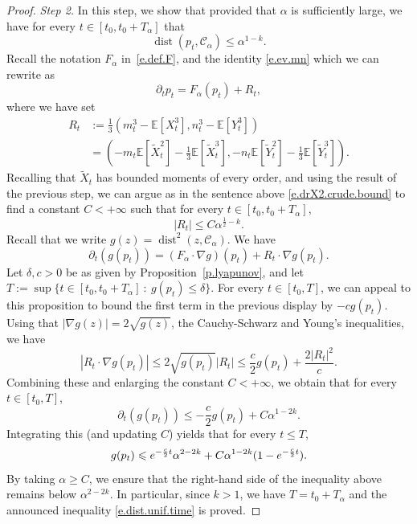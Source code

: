 \documentclass[10pt,a4paper]{amsart}
\DeclareMathOperator{\dist}{dist}
\newcommand{\E}{\mathbb E}
\newcommand{\Ll}{\left}
\newcommand{\Rr}{\right}
\newcommand{\al}{\alpha}
\newcommand{\de}{\delta}
\newcommand{\dr}{\partial}
\newcommand{\msc}{\mathscr}
\newcommand{\td}{\widetilde}
\renewcommand{\ge}{\geqslant}
\renewcommand{\le}{\leqslant}
\begin{document}
\begin{proof}
\noindent \emph{Step 2.} In this step, we show that provided that $\alpha$ is sufficiently large, we have for every $t \in [t_0, t_0 + T_\al]$ that 
\begin{equation}  
\label{e.dist.unif.time}
\dist(p_t, \msc C_\al) \le \al^{1-k}.
\end{equation}
Recall the notation $F_\al$ in~\eqref{e.def.F}, and the identity \eqref{e.ev.mn} which we can rewrite as
\begin{equation}  
\label{e.evol.p.R}
\dr_t p_t = F_\al(p_t) + R_t, 
\end{equation}
where we have set
\begin{align*}  %
R_t & := \frac 1 3 (m_t^3 - \E[X_t^3], n_t^3 - \E[Y_t^3]) 
\\
& =  \Ll(-m_t \E[\td X_t^2] -\frac 1 3 \E[\td X_t^3], -n_t \E[\td Y_t^2] - \frac 1 3 \E[\td Y_t^3]\Rr).
\end{align*}
Recalling that $\td X_t$ has bounded moments of every order, and using the result of the previous step, we can argue as in the sentence above \eqref{e.drX2.crude.bound} to find a constant $C < +\infty$ such that for every $t \in [t_0, t_0 + T_\al]$,
\begin{equation}  
\label{e.bound.R}
|R_t| \le C \al^{\frac 1 2 - k}.
\end{equation}
Recall that we write $g(z) = \dist^2(z, \msc C_\al)$. We have
\begin{equation*}  %
\dr_t (g(p_t)) = (F_\al \cdot \nabla g)(p_t) + R_t \cdot \nabla g(p_t). 
\end{equation*}
Let $\delta, c > 0$ be as given by Proposition~\ref{p.lyapunov}, and let $T := \sup \{ t \in [t_0, t_0 + T_\al] \ : \ g(p_t) \le \de\}$. For every $t \in [t_0, T]$, we can appeal to this proposition to bound the first term in the previous display by $-c g(p_t)$. 
Using that $|\nabla g(z)| = 2  \sqrt{g(z)}$, the Cauchy-Schwarz and Young's inequalities, we have
\begin{equation*}  %
|R_t \cdot \nabla g(p_t)| \le 2 \sqrt{g(p_t)} |R_t| \le \frac{c}{2} g(p_t) + \frac {2|R_t|^2}{c}.
\end{equation*}
Combining these and enlarging the constant $C < +\infty$, we obtain that for every $t \in [t_0, T]$,
\begin{equation*}  %
\dr_t (g(p_t)) \le -\frac c 2 g(p_t) + C \al^{1-2k}.
\end{equation*}
Integrating this (and updating $C$) yields that for every $t \le T$, 
\begin{equation}
\notag
g(p_t)  \le e^{-\frac{c}{2}t} \al^{2-2k} + C \al^{1-2k} (1 - e^{-\frac c 2 t}).
\end{equation}
By taking $\al \ge C$, we ensure that the right-hand side of the inequality above remains below $\al^{2-2k}$. In particular, since $k > 1$, we have $T = t_0 + T_\al$ and the announced inequality \eqref{e.dist.unif.time} is proved.


\end{proof}
\end{document}
